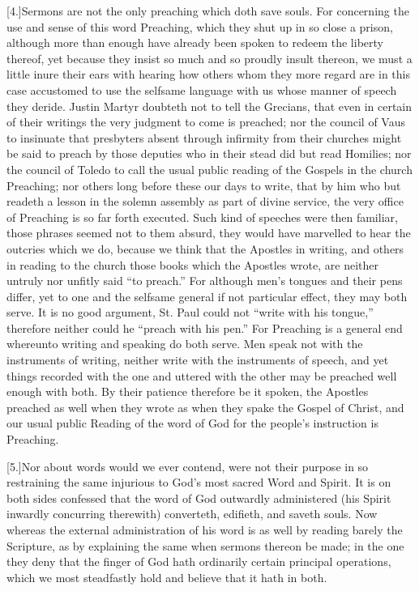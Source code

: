 [4.]Sermons are not the only preaching which doth save souls. For concerning the use and sense of this word Preaching, which they shut up in so close a prison, although more than enough have already been spoken to redeem the liberty thereof, yet because they insist so much and so proudly insult thereon, we must a little inure their ears with hearing how others whom they more regard are in this case accustomed to use the selfsame language with us whose manner of speech they deride. Justin Martyr doubteth not to tell the Grecians, that even in certain of their writings the very judgment to come is preached; nor the council of Vaus to insinuate that presbyters absent through infirmity from their churches might be said to preach by those deputies who in their stead did but  read Homilies; nor the council of Toledo to call the usual public reading of the Gospels in the church Preaching; nor others long before these our days to write, that by him who but readeth a lesson in the solemn assembly as part of divine service, the very office of Preaching is so far forth executed. Such kind of speeches were then familiar, those phrases seemed not to them absurd, they would have marvelled to hear the outcries which we do, because we think that the Apostles in writing, and others in reading to the church those books which the Apostles wrote, are neither untruly nor unfitly said “to preach.” For although men’s tongues and their pens differ, yet to one and the selfsame general if not particular effect, they may both serve. It is no good argument, St. Paul could not “write with his tongue,” therefore neither could he “preach with his pen.” For Preaching is a general end whereunto writing and speaking do both serve. Men speak not with the instruments of writing, neither write with the instruments of speech, and yet things recorded with the one and uttered with the other may be preached well enough with both. By their patience therefore be it spoken, the Apostles preached as well when they wrote as when they spake the Gospel of Christ, and our usual public Reading of the word of God for the people’s instruction is Preaching.




[5.]Nor about words would we ever contend, were not their purpose in so restraining the same injurious to God’s most sacred Word and Spirit. It is on both sides confessed that the word of God outwardly administered (his Spirit inwardly concurring therewith) converteth, edifieth, and saveth souls. Now whereas the external administration of his word is as well by reading barely the Scripture, as by explaining the same when sermons thereon be made; in the one they deny that the finger of God hath ordinarily certain principal operations, which we most steadfastly hold and believe that it hath in both.


